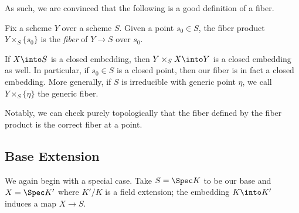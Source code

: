 \documentclass[../notes.tex]{subfiles}
\begin{document}
As such, we are convinced that the following is a good definition of a fiber.
\begin{definition}[Fiber]
	Fix a scheme $Y$ over a scheme $S$. Given a point $s_0\in S$, the fiber product $Y\times_S\{s_0\}$ is the \textit{fiber} of $Y\to S$ over $s_0$.
\end{definition}
\begin{remark}
	If $X\into S$ is a closed embedding, then $Y\times_SX\into Y$ is a closed embedding as well. In particular, if $s_0\in S$ is a closed point, then our fiber is in fact a closed embedding. More generally, if $S$ is irreducible with generic point $\eta$, we call $Y\times_S\{\eta\}$ the generic fiber.
\end{remark}
\begin{remark}
	Notably, we can check purely topologically that the fiber defined by the fiber product is the correct fiber at a point.
\end{remark}

\subsection{Base Extension}
We again begin with a special case. Take $S=\Spec K$ to be our base and $X=\Spec K'$ where $K'/K$ is a field extension; the embedding $K\into K'$ induces a map $X\to S$.
\end{document}
